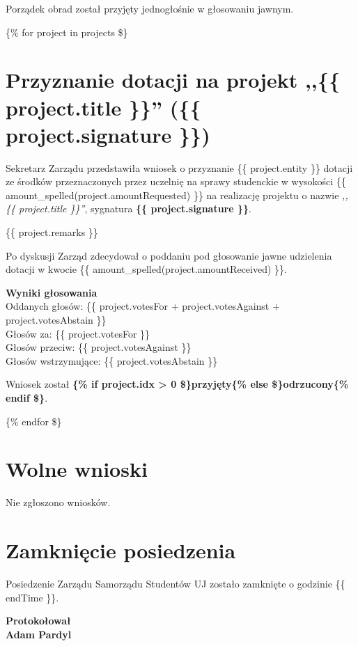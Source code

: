 \documentclass[10pt, a4paper]{article}
\newcommand{\VAR}[1]{\{\{ #1 \}\}}
\newcommand{\BLOCK}[1]{\{\% #1 \$\}}
\begin{document}
    Porządek obrad został przyjęty jednogłośnie w głosowaniu jawnym.


    \BLOCK{for project in projects}


    \section{Przyznanie dotacji na projekt ,,\VAR{project.title}'' (\VAR{project.signature})}

    Sekretarz Zarządu przedstawiła wniosek o przyznanie \VAR{project.entity} dotacji ze środków przeznaczonych przez uczelnię na sprawy studenckie w wysokości \VAR{amount_spelled(project.amountRequested)} na realizację projektu o nazwie \textit{,,\VAR{project.title}''}, sygnatura \textbf{\VAR{project.signature}}.

    \VAR{project.remarks}

    Po dyskusji Zarząd zdecydował o poddaniu pod głosowanie jawne udzielenia dotacji w kwocie \VAR{amount_spelled(project.amountReceived)}.

    \begin{center}
        \textbf{Wyniki głosowania}\smallskip\\
        Oddanych głosów: \VAR{project.votesFor + project.votesAgainst + project.votesAbstain}\\
        Głosów za: \VAR{project.votesFor}\\
        Głosów przeciw: \VAR{project.votesAgainst}\\
        Głosów wstrzymujące: \VAR{project.votesAbstain}
    \end{center}

    Wniosek został \textbf{\BLOCK{if project.idx > 0}przyjęty\BLOCK{else}odrzucony\BLOCK{endif}}.

    \BLOCK{endfor}


    \section{Wolne wnioski}

    Nie zgłoszono wniosków.


    \section{Zamknięcie posiedzenia}

    Posiedzenie Zarządu Samorządu Studentów UJ zostało zamknięte o godzinie \VAR{endTime}.

    \bigskip \bigskip
    \hfill\begin{minipage}{\dimexpr\textwidth-11cm}
    \begin{flushright}
    \textbf{
    Protokołował\\
    Adam Pardyl}
    \end{flushright}
    \end{minipage}
\end{document}
